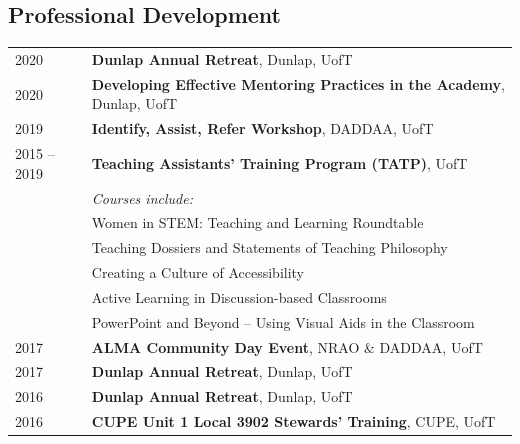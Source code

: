 \documentclass[10pt]{res} %
\begin{document}
\begin{resume}

\section{\Large Professional Development}
\vspace{-5pt} %
\noindent\makebox[\linewidth]{\rule{\textwidth}{0.4pt}}
\vspace{-20pt} %

\begin{table}[h!]
\begin{tabularx}{\textwidth}{lX}
2020 & \textbf{Dunlap Annual Retreat}, Dunlap, UofT \\
2020 & \textbf{Developing Effective Mentoring Practices in the Academy}, Dunlap, UofT \\
2019 & \textbf{Identify, Assist, Refer Workshop}, DADDAA, UofT \\
2015 -- 2019  & \textbf{Teaching Assistants' Training Program (TATP)}, UofT \\
				& \textit{Courses include:} \\
                                  & Women in STEM: Teaching and Learning Roundtable \\
                                  & Teaching Dossiers and Statements of Teaching Philosophy \\
                                  & Creating a Culture of Accessibility \\
                                  & Active Learning in Discussion-based Classrooms \\
                                  & PowerPoint and Beyond -- Using Visual Aids in the Classroom \\
2017 & \textbf{ALMA Community Day Event}, NRAO \& DADDAA, UofT \\
2017 & \textbf{Dunlap Annual Retreat}, Dunlap, UofT \\
2016 & \textbf{Dunlap Annual Retreat}, Dunlap, UofT \\
2016 & \textbf{CUPE Unit 1 Local 3902 Stewards' Training}, CUPE, UofT
\end{tabularx}
\end{table}


\end{resume}
\end{document}
